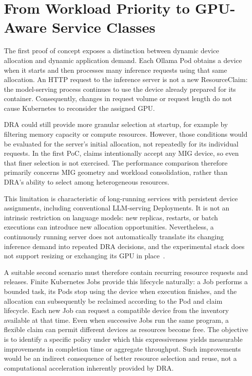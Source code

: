 \section{From Workload Priority to GPU-Aware Service Classes}
\label{subsec:kueue-problem}

The first proof of concept exposes a distinction between dynamic device allocation and dynamic application demand. Each Ollama Pod obtains a device when it starts and then processes many inference requests using that same allocation. An HTTP request to the inference server is not a new ResourceClaim: the model-serving process continues to use the device already prepared for its container. Consequently, changes in request volume or request length do not cause Kubernetes to reconsider the assigned GPU.

DRA could still provide more granular selection at startup, for example by filtering memory capacity or compute resources. However, those conditions would be evaluated for the server's initial allocation, not repeatedly for its individual requests. In the first PoC, claims intentionally accept any MIG device, so even that finer selection is not exercised. The performance comparison therefore primarily concerns MIG geometry and workload consolidation, rather than DRA's ability to select among heterogeneous resources.

This limitation is characteristic of long-running services with persistent device assignments, including conventional LLM-serving Deployments. It is not an intrinsic restriction on language models: new replicas, restarts, or batch executions can introduce new allocation opportunities. Nevertheless, a continuously running server does not automatically translate its changing inference demand into repeated DRA decisions, and the experimental stack does not support resizing or exchanging its GPU in place~\cite{kubernetes135dra}.

A suitable second scenario must therefore contain recurring resource requests and releases. Finite Kubernetes Jobs provide this lifecycle naturally: a Job performs a bounded task, its Pods stop using the device when execution finishes, and the allocation can subsequently be reclaimed according to the Pod and claim lifecycle. Each new Job can request a compatible device from the inventory available at that time. Even when successive Jobs run the same program, a flexible claim can permit different devices as resources become free. The objective is to identify a specific policy under which this expressiveness yields measurable improvements in completion time or aggregate throughput. Such improvements would be an indirect consequence of better resource selection and reuse, not a computational acceleration inherently provided by DRA.

